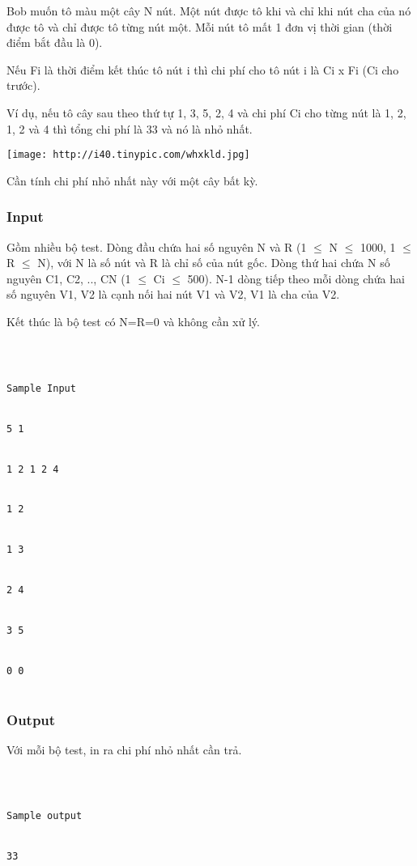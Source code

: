 







   Bob muốn tô màu một cây N nút. Một nút được tô khi và chỉ khi nút cha của nó được tô và chỉ được tô từng nút một. Mỗi nút tô mất 1 đơn vị thời gian (thời điểm bắt đầu là 0).  

   Nếu Fi là thời điểm kết thúc tô nút i thì chi phí cho tô nút i là Ci x Fi (Ci cho trước).  

   Ví dụ, nếu tô cây sau theo thứ tự 1, 3, 5, 2, 4 và chi phí Ci cho từng nút là 1, 2, 1, 2 và 4 thì tổng chi phí là 33 và nó là nhỏ nhất.  

\href{http://tinypic.com}{}


\texttt{[image: http://i40.tinypic.com/whxkld.jpg]}



   Cần tính chi phí nhỏ nhất này với một cây bất kỳ.  

\subsubsection{   Input  }

   Gồm nhiều bộ test. Dòng đầu chứa hai số nguyên N và R (1  $\le$  N  $\le$  1000, 1  $\le$  R  $\le$  N), với N là số nút và R là chỉ số của nút gốc. Dòng thứ hai chứa N số nguyên C1, C2, .., CN (1  $\le$  Ci  $\le$  500). N-1 dòng tiếp theo mỗi dòng chứa hai số nguyên V1, V2 là cạnh nối hai nút V1 và V2, V1 là cha của V2.  

   Kết thúc là bộ test có N=R=0 và không cần xử lý.  
\begin{verbatim}



Sample Input


5 1 


1 2 1 2 4 


1 2 


1 3 


2 4 


3 5 


0 0 


\end{verbatim}

\subsubsection{   Output  }

   Với mỗi bộ test, in ra chi phí nhỏ nhất cần trả.  
\begin{verbatim}



Sample output


33


\end{verbatim}

